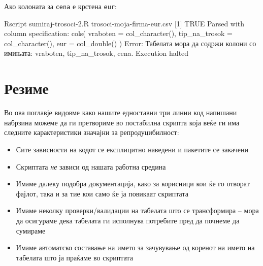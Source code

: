 \documentclass[
]{book}
\newenvironment{Shaded}{\begin{snugshade}}{\end{snugshade}}
\newcommand{\ExtensionTok}[1]{#1}
\newcommand{\NormalTok}[1]{#1}
\newcommand{\StringTok}[1]{\textcolor[rgb]{0.31,0.60,0.02}{#1}}
\providecommand{\tightlist}{%
  \setlength{\itemsep}{0pt}\setlength{\parskip}{0pt}}
\begin{document}
Ако колоната за \texttt{cena} е крстена \texttt{eur}:

\begin{Shaded}
\begin{Highlighting}[]
\ExtensionTok{Rscript}\NormalTok{ sumiraj{-}trosoci{-}2.R trosoci{-}moja{-}firma{-}eur.csv}
\NormalTok{[}\ExtensionTok{1}\NormalTok{] TRUE}
\ExtensionTok{Parsed}\NormalTok{ with column specification:}
\ExtensionTok{cols}\NormalTok{(}
  \ExtensionTok{vraboten}\NormalTok{ = col\_character(),}
  \ExtensionTok{tip\_na\_trosok}\NormalTok{ = col\_character(),}
  \ExtensionTok{eur}\NormalTok{ = col\_double()}
\NormalTok{)}
\ExtensionTok{Error}\NormalTok{: Табелата мора да содржи колони со имињата: }\StringTok{\textquotesingle{}vraboten\textquotesingle{}}\NormalTok{, }\StringTok{\textquotesingle{}tip\_na\_trosok\textquotesingle{}}\NormalTok{, }\StringTok{\textquotesingle{}cena\textquotesingle{}}\NormalTok{.}
\ExtensionTok{Execution}\NormalTok{ halted}
\end{Highlighting}
\end{Shaded}

\hypertarget{ux440ux435ux437ux438ux43cux435-1}{%
\section{Резиме}\label{ux440ux435ux437ux438ux43cux435-1}}

Во ова поглавје видовме како нашите едноставни три линии код напишани набрзина можеме да ги претвориме во постабилна скрипта која веќе ги има следните карактеристики значајни за репродуцибилност:

\begin{itemize}
\tightlist
\item
  Сите зависности на кодот се експлицитно наведени и пакетите се закачени\\
\item
  Скриптата \emph{не} зависи од нашата работна средина\\
\item
  Имаме далеку подобра документација, како за корисници кои ќе го отворат фајлот, така и за тие кои само ќе ја повикаат скриптата\\
\item
  Имаме неколку проверки/валидации на табелата што се трансформира -- мора да осигураме дека табелата ги исполнува потребите пред да почнеме да сумираме\\
\item
  Имаме автоматско составање на името за зачувување од коренот на името на табелата што ја праќаме во скриптата
\end{itemize}
\end{document}
